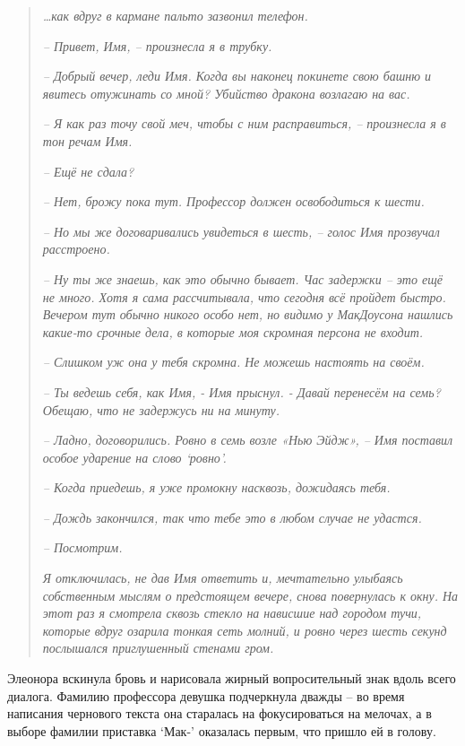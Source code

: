 \documentclass[
  a5paperpaper,
  DIV=11,
  numbers=noendperiod]{scrreprt}
\begin{document}
\begin{quote}
\emph{\ldots как вдруг в кармане пальто зазвонил телефон.}

\emph{-- Привет, Имя, -- произнесла я в трубку.}

\emph{-- Добрый вечер, леди Имя. Когда вы наконец покинете свою башню и
явитесь отужинать со мной? Убийство дракона возлагаю на вас.}

\emph{-- Я как раз точу свой меч, чтобы с ним расправиться, --
произнесла я в тон речам Имя.}

\emph{-- Ещё не сдала?}

\emph{-- Нет, брожу пока тут. Профессор должен освободиться к шести. }

\emph{-- Но мы же договаривались увидеться в шесть, -- голос Имя
прозвучал расстроено.}

\emph{-- Ну ты же знаешь, как это обычно бывает. Час задержки -- это ещё
не много. Хотя я сама рассчитывала, что сегодня всё пройдет быстро.
Вечером тут обычно никого особо нет, но видимо у МакДоусона нашлись
какие-то срочные дела, в которые моя скромная персона не входит.}

\emph{-- Слишком уж она у тебя скромна. Не можешь настоять на своём.}

\emph{-- Ты ведешь себя, как Имя, - Имя прыснул. - Давай перенесём на
семь? Обещаю, что не задержусь ни на минуту.}

\emph{-- Ладно, договорились. Ровно в семь возле «Нью Эйдж», -- Имя
поставил особое ударение на слово `ровно'.}

\emph{-- Когда приедешь, я уже промокну насквозь, дожидаясь тебя.}

\emph{-- Дождь закончился, так что тебе это в любом случае не удастся.}

\emph{-- Посмотрим.}

\emph{Я отключилась, не дав Имя ответить и, мечтательно улыбаясь
собственным мыслям о предстоящем вечере, снова повернулась к окну. На
этот раз я смотрела сквозь стекло на нависшие над городом тучи, которые
вдруг озарила тонкая сеть молний, и ровно через шесть секунд послышался
приглушенный стенами гром.}
\end{quote}

Элеонора вскинула бровь и нарисовала жирный вопросительный знак вдоль
всего диалога. Фамилию профессора девушка подчеркнула дважды -- во время
написания чернового текста она старалась на фокусироваться на мелочах, а
в выборе фамилии приставка `Мак-' оказалась первым, что пришло ей в
голову.
\end{document}

